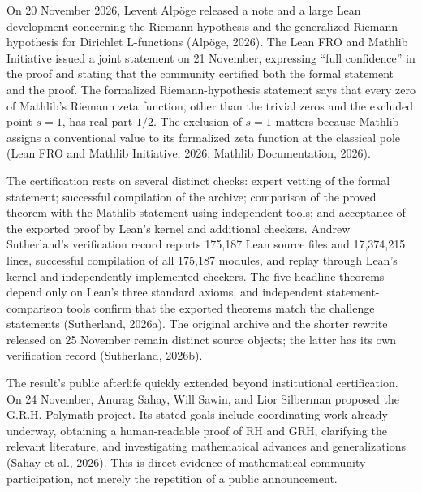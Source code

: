 \documentclass[sn-apa]{sn-jnl}
\begin{document}
On 20 November 2026, Levent Alpöge released a note and a large Lean development concerning the Riemann hypothesis and the generalized Riemann hypothesis for Dirichlet L-functions (Alpöge, 2026). The Lean FRO and Mathlib Initiative issued a joint statement on 21 November, expressing “full confidence” in the proof and stating that the community certified both the formal statement and the proof. The formalized Riemann-hypothesis statement says that every zero of Mathlib’s Riemann zeta function, other than the trivial zeros and the excluded point \(s=1\), has real part \(1/2\). The exclusion of \(s=1\) matters because Mathlib assigns a conventional value to its formalized zeta function at the classical pole (Lean FRO and Mathlib Initiative, 2026; Mathlib Documentation, 2026).

The certification rests on several distinct checks: expert vetting of the formal statement; successful compilation of the archive; comparison of the proved theorem with the Mathlib statement using independent tools; and acceptance of the exported proof by Lean’s kernel and additional checkers. Andrew Sutherland’s verification record reports 175,187 Lean source files and 17,374,215 lines, successful compilation of all 175,187 modules, and replay through Lean’s kernel and independently implemented checkers. The five headline theorems depend only on Lean’s three standard axioms, and independent statement-comparison tools confirm that the exported theorems match the challenge statements (Sutherland, 2026a). The original archive and the shorter rewrite released on 25 November remain distinct source objects; the latter has its own verification record (Sutherland, 2026b).

The result’s public afterlife quickly extended beyond institutional certification. On 24 November, Anurag Sahay, Will Sawin, and Lior Silberman proposed the G.R.H. Polymath project. Its stated goals include coordinating work already underway, obtaining a human-readable proof of RH and GRH, clarifying the relevant literature, and investigating mathematical advances and generalizations (Sahay et al., 2026). This is direct evidence of mathematical-community participation, not merely the repetition of a public announcement.
\end{document}
